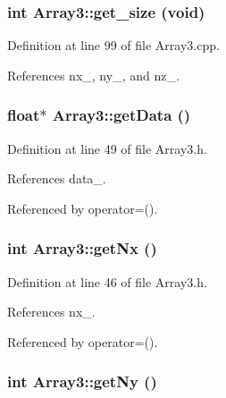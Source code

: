 \subsubsection[{get\_\-size}]{\setlength{\rightskip}{0pt plus 5cm}int Array3::get\_\-size (void)}\label{classArray3_a7b1da51445317025d5727927b1cd853d}


Definition at line 99 of file Array3.cpp.



References nx\_\-, ny\_\-, and nz\_\-.

\subsubsection[{getData}]{\setlength{\rightskip}{0pt plus 5cm}float$\ast$ Array3::getData ()}\label{classArray3_a246734002eb950cfce43b63cf9b1ec4f}


Definition at line 49 of file Array3.h.



References data\_\-.



Referenced by operator=().

\subsubsection[{getNx}]{\setlength{\rightskip}{0pt plus 5cm}int Array3::getNx ()}\label{classArray3_aadb24645a52627aba3cc36b6378df78c}


Definition at line 46 of file Array3.h.



References nx\_\-.



Referenced by operator=().

\subsubsection[{getNy}]{\setlength{\rightskip}{0pt plus 5cm}int Array3::getNy ()}\label{classArray3_af29d2eab1f67d70a5430c438d54026f2}


